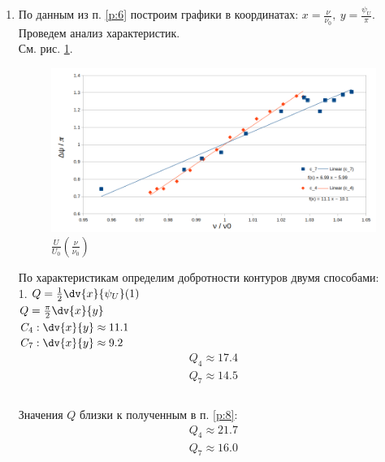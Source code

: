 \documentclass{report}
\begin{document}
\begin{enumerate}
	\item По данным из п. \ref{p:6} построим графики в координатах:
	      $ x = \frac{\nu}{\nu_0},\ y = \frac{\psi_U}{\pi} $. Проведем анализ характеристик.\\
	      См. рис. \ref{fig:psi}.\\
	      \begin{figure}[H]
		      \centering
		      \def\svgwidth{\columnwidth}
		      \includegraphics[scale = 0.5]{figures/Psi2.png}
		      \caption{$\frac{U}{U_0}(\frac{\nu}{\nu_0})$}
		      \label{fig:psi}
	      \end{figure}
	      По характеристикам определим добротности контуров двумя способами:\\
	      1. $ Q = \frac{1}{2} \dv{x}{\psi_U}(1) $\\
	      $ Q = \frac{\pi}{2} \dv{x}{y} $\\
	      $ C_4: \dv{x}{y} \approx 11.1 $\\
	      $ C_7: \dv{x}{y} \approx 9.2 $\\
	      \begin{gather}
		      Q_4 \approx 17.4 \\
		      Q_7 \approx 14.5 \\
	      \end{gather}
	      \\


	      Значения $ Q $ близки к полученным в п. \ref{p:8}:\\
	      \begin{gather}
		      Q_4 \approx 21.7 \\
		      Q_7 \approx 16.0 \\
	      \end{gather}


\end{enumerate}
\end{document}
